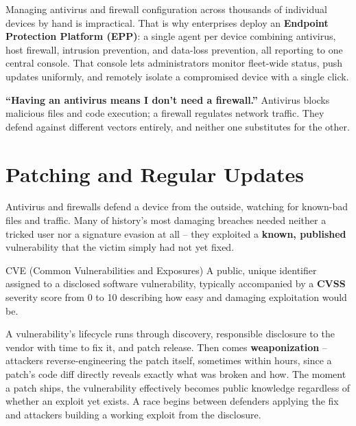 Managing antivirus and firewall configuration across thousands of individual devices by hand is
impractical. That is why enterprises deploy an \textbf{Endpoint Protection Platform (EPP)}: a
single agent per device combining antivirus, host firewall, intrusion prevention, and data-loss
prevention, all reporting to one central console. That console lets administrators monitor
fleet-wide status, push updates uniformly, and remotely isolate a compromised device with a single
click.

\begin{misconception}
\textbf{``Having an antivirus means I don't need a firewall.''} Antivirus blocks malicious files
and code execution; a firewall regulates network traffic. They defend against different vectors
entirely, and neither one substitutes for the other.
\end{misconception}

\section{Patching and Regular Updates}

Antivirus and firewalls defend a device from the outside, watching for known-bad files and
traffic. Many of history's most damaging breaches needed neither a tricked user nor a signature
evasion at all -- they exploited a \textbf{known, published} vulnerability that the victim simply
had not yet fixed.

\begin{definition}{CVE (Common Vulnerabilities and Exposures)}
A public, unique identifier assigned to a disclosed software vulnerability, typically accompanied
by a \textbf{CVSS} severity score from 0 to 10 describing how easy and damaging exploitation would
be.
\end{definition}

A vulnerability's lifecycle runs through discovery, responsible disclosure to the vendor with time
to fix it, and patch release. Then comes \textbf{weaponization} -- attackers reverse-engineering
the patch itself, sometimes within hours, since a patch's code diff directly reveals exactly what
was broken and how. The moment a patch ships, the vulnerability effectively becomes public
knowledge regardless of whether an exploit yet exists. A race begins between defenders applying
the fix and attackers building a working exploit from the disclosure.

